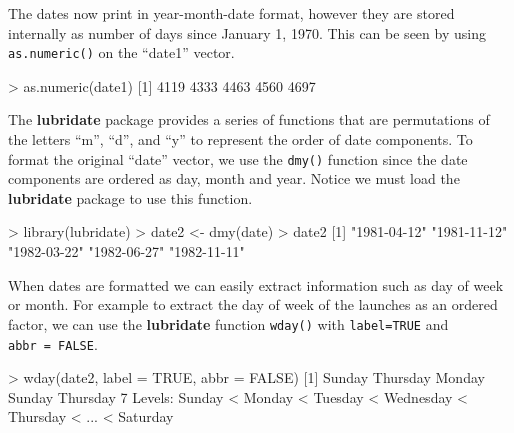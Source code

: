 \documentclass[
]{book}
\newenvironment{Shaded}{\begin{snugshade}}{\end{snugshade}}
\newcommand{\AttributeTok}[1]{\textcolor[rgb]{0.77,0.63,0.00}{#1}}
\newcommand{\ConstantTok}[1]{\textcolor[rgb]{0.00,0.00,0.00}{#1}}
\newcommand{\DecValTok}[1]{\textcolor[rgb]{0.00,0.00,0.81}{#1}}
\newcommand{\FunctionTok}[1]{\textcolor[rgb]{0.00,0.00,0.00}{#1}}
\newcommand{\NormalTok}[1]{#1}
\newcommand{\OtherTok}[1]{\textcolor[rgb]{0.56,0.35,0.01}{#1}}
\newcommand{\SpecialCharTok}[1]{\textcolor[rgb]{0.00,0.00,0.00}{#1}}
\newcommand{\StringTok}[1]{\textcolor[rgb]{0.31,0.60,0.02}{#1}}
\begin{document}
The dates now print in year-month-date format, however they are stored internally as number of days since January 1, 1970. This can be seen by using \texttt{as.numeric()} on the ``date1'' vector.

\begin{Shaded}
\begin{Highlighting}[]
\SpecialCharTok{\textgreater{}} \FunctionTok{as.numeric}\NormalTok{(date1)}
\NormalTok{[}\DecValTok{1}\NormalTok{] }\DecValTok{4119} \DecValTok{4333} \DecValTok{4463} \DecValTok{4560} \DecValTok{4697}
\end{Highlighting}
\end{Shaded}

The \textbf{lubridate} package provides a series of functions that are permutations of the letters ``m'', ``d'', and ``y'' to represent the order of date components. To format the original ``date'' vector, we use the \texttt{dmy()} function since the date components are ordered as day, month and year. Notice we must load the \textbf{lubridate} package to use this function.

\begin{Shaded}
\begin{Highlighting}[]
\SpecialCharTok{\textgreater{}} \FunctionTok{library}\NormalTok{(lubridate)}
\SpecialCharTok{\textgreater{}}\NormalTok{ date2 }\OtherTok{\textless{}{-}} \FunctionTok{dmy}\NormalTok{(date)}
\SpecialCharTok{\textgreater{}}\NormalTok{ date2}
\NormalTok{[}\DecValTok{1}\NormalTok{] }\StringTok{"1981{-}04{-}12"} \StringTok{"1981{-}11{-}12"} \StringTok{"1982{-}03{-}22"} \StringTok{"1982{-}06{-}27"} \StringTok{"1982{-}11{-}11"}
\end{Highlighting}
\end{Shaded}

When dates are formatted we can easily extract information such as day of week or month. For example to extract the day of week of the launches as an ordered factor, we can use the \textbf{lubridate} function \texttt{wday()} with \texttt{label=TRUE} and \texttt{abbr\ =\ FALSE}.

\begin{Shaded}
\begin{Highlighting}[]
\SpecialCharTok{\textgreater{}} \FunctionTok{wday}\NormalTok{(date2, }\AttributeTok{label =} \ConstantTok{TRUE}\NormalTok{, }\AttributeTok{abbr =} \ConstantTok{FALSE}\NormalTok{)}
\NormalTok{[}\DecValTok{1}\NormalTok{] Sunday   Thursday Monday   Sunday   Thursday}
\DecValTok{7}\NormalTok{ Levels}\SpecialCharTok{:}\NormalTok{ Sunday }\SpecialCharTok{\textless{}}\NormalTok{ Monday }\SpecialCharTok{\textless{}}\NormalTok{ Tuesday }\SpecialCharTok{\textless{}}\NormalTok{ Wednesday }\SpecialCharTok{\textless{}}\NormalTok{ Thursday }\SpecialCharTok{\textless{}}\NormalTok{ ... }\SpecialCharTok{\textless{}}\NormalTok{ Saturday}
\end{Highlighting}
\end{Shaded}
\end{document}
